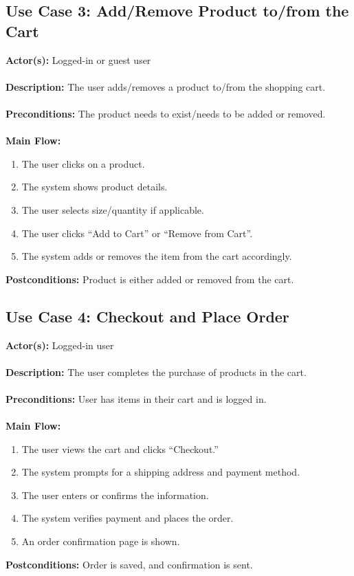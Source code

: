 \documentclass[a4paper,12pt]{article}
\begin{document}
	\subsection*{Use Case 3: Add/Remove Product to/from the Cart}
	\textbf{Actor(s):} Logged-in or guest user \\ \\
	\textbf{Description:} The user adds/removes a product to/from the shopping cart. \\ \\
	\textbf{Preconditions:} The product needs to exist/needs to be added or removed. \\ \\
	\textbf{Main Flow:}
	\begin{enumerate}
  		\item The user clicks on a product.
  		\item The system shows product details.
  		\item The user selects size/quantity if applicable.
  		\item The user clicks ``Add to Cart'' or ``Remove from Cart''.
  		\item The system adds or removes the item from the cart accordingly.
	\end{enumerate}
	\textbf{Postconditions:} Product is either added or removed from the cart.
	\subsection*{Use Case 4: Checkout and Place Order}
	\textbf{Actor(s):} Logged-in user \\ \\
	\textbf{Description:} The user completes the purchase of products in the cart. \\ \\
	\textbf{Preconditions:} User has items in their cart and is logged in. \\ \\
	\textbf{Main Flow:}
	\begin{enumerate}
  		\item The user views the cart and clicks ``Checkout.''
  		\item The system prompts for a shipping address and payment method.
  		\item The user enters or confirms the information.
  		\item The system verifies payment and places the order.
  		\item An order confirmation page is shown.
	\end{enumerate}
	\textbf{Postconditions:} Order is saved, and confirmation is sent.
\end{document}
